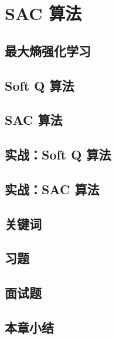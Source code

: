 
\section{ SAC 算法}
\subsection{最大熵强化学习}
\subsection{ Soft Q 算法}
\subsection{ SAC 算法}
\subsection{实战：Soft Q 算法}
\subsection{实战：SAC 算法}

\subsection{关键词}
\subsection{习题}
\subsection{面试题}
\subsection{本章小结}